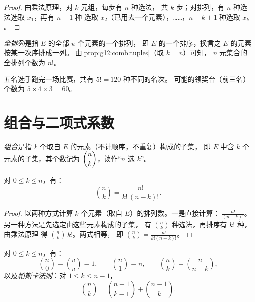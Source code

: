 \begin{proof}
由乘法原理，对 $k$-元组，每步有 $n$ 种选法，
共 $k$ 步；对排列，有 $n$ 种选法选取 $x_1$，再有 $n - 1$ 种
选取 $x_2$（已用去一个元素），……，$n - k + 1$ 种选取 $x_k$。
\end{proof}

\begin{definition}[全排列]\label{def:g12:comb:permutation}
\emph{全排列}是指 $E$ 的全部 $n$ 个元素的一个排列，
即 $E$ 的一个排序，换言之 $E$ 的元素按某一次序排成一列。
由\cref{prop:g12:comb:tuples}（取 $k = n$）可知，
$n$ 元集合的全排列个数为 $n!$。
\end{definition}

\begin{example}
五名选手跑完一场比赛，共有 $5! = 120$ 种不同的名次。
可能的领奖台（前三名）个数为 $5 \times 4 \times 3 = 60$。
\end{example}

\section{组合与二项式系数}

\begin{definition}[组合]\label{def:g12:comb:combination}
\emph{组合}是指 $k$ 个取自 $E$ 的元素（不计顺序，不重复）构成的子集，
即 $E$ 中含 $k$ 个元素的子集，其个数记为
$\dbinom{n}{k}$，读作“$n$ 选 $k$”。
\end{definition}

\begin{theorem}\label{thm:g12:comb:binomformula}
对 $0 \leq k \leq n$，有：
\[
\binom{n}{k} = \frac{n!}{k!\,(n-k)!} .
\]
\end{theorem}

\begin{proof}
以两种方式计算 $k$ 个元素（取自 $E$）的排列数。一是直接计算：
$\frac{n!}{(n-k)!}$。另一种方法是先选定由这些元素构成的子集，
有 $\binom nk$ 种选法，再排序有 $k!$ 种，由乘法原理
得 $\binom{n}{k}\,k!$。两式相等，
即 $\binom nk = \frac{n!}{k!(n-k)!}$。
\end{proof}

\begin{proposition}[基本恒等式]\label{prop:g12:comb:identities}
对 $0 \leq k \leq n$，有：
\[
\binom{n}{0} = \binom{n}{n} = 1, \qquad
\binom{n}{1} = n, \qquad
\binom{n}{k} = \binom{n}{n-k},
\]
以及\emph{帕斯卡法则}：对 $1 \leq k \leq n-1$，
\[
\binom{n}{k} = \binom{n-1}{k-1} + \binom{n-1}{k}.
\]
\end{proposition}

